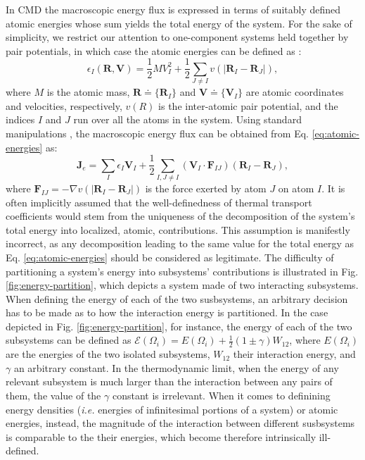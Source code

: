 In CMD the macroscopic energy flux is expressed in terms of suitably
defined atomic energies whose sum yields the total energy of the
system.  For the sake of simplicity, we restrict our attention to
one-component systems held together by pair potentials, in which case
the atomic energies can be defined as \cite{Hansen:2006}:
\begin{equation}
  \epsilon_{I}(\mathbf{R},\mathbf{V}) = \frac{1}{2}MV_{I}^{2} +
  \frac{1}{2}\sum_{J\ne I}
  v(|\mathbf{R}_{I}-\mathbf{R}_{J}|), \label{eq:atomic-energies} 
\end{equation}
where $M$ is the atomic mass, $\mathbf{R}\doteq\{\mathbf{R}_{I}\}$ and
$\mathbf{V}\doteq\{\mathbf{V}_{I}\}$ are atomic coordinates and
velocities, respectively, $v(R)$ is the inter-atomic pair potential,
and the indices $I$ and $J$ run over all the atoms in the system.
Using standard manipulations \cite{Hansen:2006}, the macroscopic
energy flux can be obtained from Eq. \eqref{eq:atomic-energies} as:
\begin{equation}
  \mathbf{J}_{e}=\sum_{I}\epsilon_{I}\mathbf{V}_{I} +
  \frac{1}{2}\sum_{I, J\ne I}(\mathbf{V}_{I}\cdot\mathbf{F}_{IJ})
  (\mathbf{R}_{I}-\mathbf{R}_{J}), \label{eq:classical-current}
\end{equation}
where $\mathbf{F}_{IJ}=-\nabla v(|\mathbf{R}_{I}-\mathbf{R}_{J}|)$ is
the force exerted by atom $J$ on atom $I$. It is often implicitly
assumed that the well-definedness of thermal transport coefficients
would stem from the uniqueness of the decomposition of the system's
total energy into localized, atomic, contributions. This assumption is
manifestly incorrect, as any decomposition leading to the same value
for the total energy as Eq. \eqref{eq:atomic-energies} should be
considered as legitimate. The difficulty of partitioning a system's
energy into subsystems' contributions is illustrated in
Fig. \ref{fig:energy-partition}, which depicts a system made of two
interacting subsystems. When defining the energy of each of the two
susbsystems, an arbitrary decision has to be made as to how the
interaction energy is partitioned. In the case depicted in
Fig. \ref{fig:energy-partition}, for instance, the energy of each of
the two subsystems can be defined as
$\mathcal{E}(\Omega_i) = E(\Omega_i) + \frac{1}{2}(1\pm\gamma)W_{12}$, 
where $E(\Omega_i)$ are the energies of the two isolated subsystems,
$W_{12}$ their interaction energy, and $\gamma$ an arbitrary
constant. In the thermodynamic limit, when the energy of any relevant
subsystem is much larger than the interaction between any pairs of
them, the value of the $\gamma$ constant is irrelevant. When it comes
to definining energy densities (\emph{i.e.} energies of infinitesimal
portions of a system) or atomic energies, instead, the magnitude of
the interaction between different susbsystems is comparable to
the their energies, which become therefore intrinsically ill-defined.

